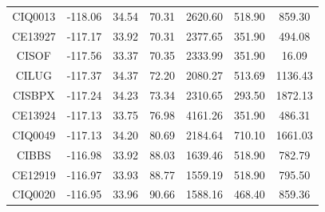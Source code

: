 \begin{table}[!ht]
{\begin{tabular}{@{}ccccccc@{}}
      CIQ0013    & -118.06           & 34.54             & 70.31           & 2620.60     & 518.90          & 859.30        \\
      CE13927    & -117.17           & 33.92             & 70.31           & 2377.65     & 351.90          & 494.08        \\
      CISOF      & -117.56           & 33.37             & 70.35           & 2333.99     & 351.90          & 16.09         \\
      CILUG      & -117.37           & 34.37             & 72.20           & 2080.27     & 513.69          & 1136.43       \\
      CISBPX     & -117.24           & 34.23             & 73.34           & 2310.65     & 293.50          & 1872.13       \\
      CE13924    & -117.13           & 33.75             & 76.98           & 4161.26     & 351.90          & 486.31        \\
      CIQ0049    & -117.13           & 34.20             & 80.69           & 2184.64     & 710.10          & 1661.03       \\
      CIBBS      & -116.98           & 33.92             & 88.03           & 1639.46     & 518.90          & 782.79        \\
      CE12919    & -116.97           & 33.93             & 88.77           & 1559.19     & 518.90          & 795.50        \\
      CIQ0020    & -116.95           & 33.96             & 90.66           & 1588.16     & 468.40          & 859.36        \\
      \bottomrule
    \end{tabular}}
\end{table}


